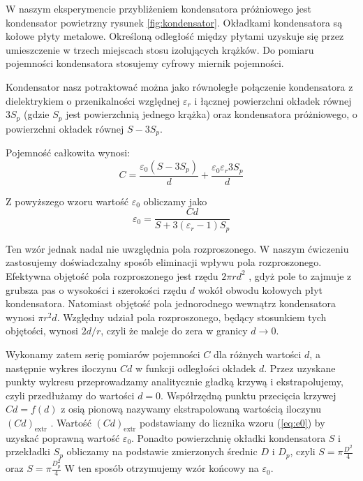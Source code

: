 \documentclass{fizykalab}
\newcommand{\cde}{\ensuremath{(Cd)_\text{extr}}}
\begin{document}
W naszym eksperymencie przybliżeniem kondensatora próżniowego jest kondensator
powietrzny rysunek \ref{fig:kondensator}. Okładkami kondensatora są kołowe płyty metalowe.
Określoną odległość
między płytami uzyskuje się przez umieszczenie w trzech miejscach 
stosu izolujących krążków.
Do pomiaru pojemności kondensatora stosujemy cyfrowy miernik pojemności.

Kondensator nasz potraktować można jako równoległe połączenie kondensatora
z dielektrykiem o przenikalności względnej $\varepsilon_r$ i łącznej 
powierzchni okładek równej $3S_p$ (gdzie
$S_p$ jest powierzchnią jednego krążka) oraz kondensatora próżniowego,
o powierzchni okładek równej $S - 3S_p$.

Pojemność całkowita wynosi:
\begin{equation*}
    C = \frac{\varepsilon_0(S - 3S_p)}{d} + 
        \frac{\varepsilon_0 \varepsilon_r 3S_p}{d} 
\end{equation*}

Z powyższego wzoru wartość $\varepsilon_0$  obliczamy jako
\begin{equation}
    \label{eq:e0}
    \varepsilon_0  = \frac{Cd}{S + 3(\varepsilon_r - 1) S_p}
\end{equation}

Ten wzór jednak nadal nie uwzględnia 
pola rozproszonego.
W naszym ćwiczeniu zastosujemy doświadczalny sposób eliminacji wpływu pola rozproszonego.
Efektywna objętość  pola rozproszonego jest rzędu $2 \pi r d^2$
, gdyż pole to zajmuje z grubsza pas
o wysokości i szerokości rzędu $d$ wokół obwodu kołowych płyt kondensatora. Natomiast
objętość pola jednorodnego wewnątrz kondensatora wynosi $\pi r^2 d$.
Względny udział pola
rozproszonego, będący stosunkiem tych objętości, wynosi $2d/r$, czyli że maleje do zera w
granicy $d \to 0$. 


Wykonamy zatem serię pomiarów pojemności $C$ dla różnych wartości $d$, a następnie
wykres iloczynu $Cd$ w funkcji odległości okładek $d$.
Przez uzyskane punkty wykresu przeprowadzamy analitycznie gładką krzywą
i ekstrapolujemy, czyli przedłużamy do wartości $d = 0$. Współrzędną punktu przecięcia
krzywej $Cd = f(d)$ z osią pionową nazywamy ekstrapolowaną wartością iloczynu $\cde$ .
Wartość $\cde$ podstawiamy do licznika wzoru (\ref{eq:e0}) by 
uzyskać poprawną wartość $\varepsilon_0$.
Ponadto powierzchnię okładki kondensatora $S$ i przekładki $S_p$ obliczamy na podstawie
zmierzonych średnic $D$ i $D_p$, czyli $S = \pi \frac{D^2}{4}$ oraz $S = \pi \frac{D_p^2}{4}$
W ten sposób otrzymujemy wzór końcowy na $\varepsilon_0$.
\end{document}
